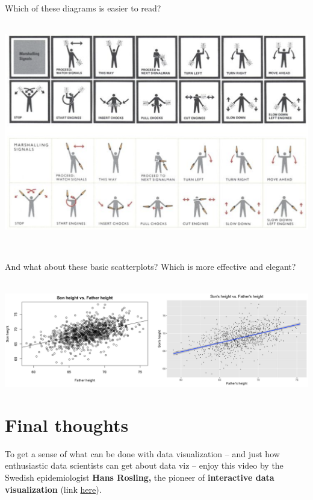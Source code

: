 \documentclass[]{book}
\begin{document}
~

Which of these diagrams is easier to read?

~\\

\includegraphics{img/vis19.png}

~

And what about these basic scatterplots? Which is more effective and elegant?

~\\

\includegraphics{img/vish.png}

\hypertarget{final-thoughts}{%
\section*{Final thoughts}\label{final-thoughts}}

To get a sense of what can be done with data visualization -- and just how enthusiastic data scientists can get about data viz -- enjoy this video by the Swedish epidemiologist \textbf{Hans Rosling,} the pioneer of \textbf{interactive data visualization} (link \href{https://www.youtube.com/watch?v=jbkSRLYSojo\&t=2s}{here}).

~

~
\end{document}
